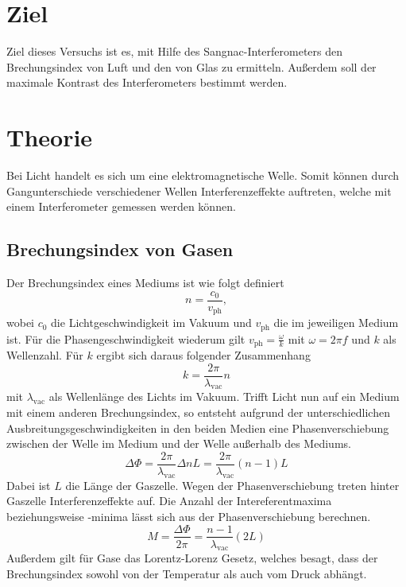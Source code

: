 \section{Ziel}
\label{sec:Ziel}
Ziel dieses Versuchs ist es, mit Hilfe des Sangnac-Interferometers den Brechungsindex von Luft und den von Glas zu ermitteln. Außerdem soll der maximale Kontrast des Interferometers bestimmt werden.

\section{Theorie}
\label{sec:theorie}
Bei Licht handelt es sich um eine elektromagnetische Welle. Somit können durch Gangunterschiede verschiedener Wellen Interferenzeffekte auftreten, welche mit einem Interferometer gemessen werden können.

\subsection{Brechungsindex von Gasen}
Der Brechungsindex eines Mediums ist wie folgt definiert
\begin{equation}
  n=\frac{c_0}{v_\mathrm{ph}},
\end{equation}
wobei $c_0$ die Lichtgeschwindigkeit im Vakuum und $v_\mathrm{ph}$ die im jeweiligen Medium ist. Für die Phasengeschwindigkeit wiederum gilt $v_\mathrm{ph}=\frac{\omega}{k}$ mit $\omega = 2\pi f$ und $k$ als Wellenzahl. Für $k$ ergibt sich daraus folgender Zusammenhang
\begin{equation}
  k=\frac{2\pi}{\lambda_\mathrm{vac}}n
\end{equation}
mit $\lambda_\mathrm{vac}$ als Wellenlänge des Lichts im Vakuum. Trifft Licht nun auf ein Medium mit einem anderen Brechungsindex, so entsteht aufgrund der unterschiedlichen Ausbreitungsgeschwindigkeiten in den beiden Medien eine Phasenverschiebung zwischen der Welle im Medium und der Welle außerhalb des Mediums.
\begin{equation}
  \Delta \Phi = \frac{2\pi}{\lambda_\mathrm{vac}}\Delta n L = \frac{2\pi}{\lambda_\mathrm{vac}}(n-1)L
\end{equation}
Dabei ist $L$ die Länge der Gaszelle. Wegen der Phasenverschiebung treten hinter Gaszelle Interferenzeffekte auf. Die Anzahl der Intereferentmaxima beziehungsweise -minima lässt sich aus der Phasenverschiebung berechnen.
\begin{equation}
  M=\frac{\Delta \Phi}{2\pi} = \frac{n-1}{\lambda_\mathrm{vac}}(2L)
\end{equation}
Außerdem gilt für Gase das Lorentz-Lorenz Gesetz, welches besagt, dass der Brechungsindex sowohl von der Temperatur als auch vom Druck abhängt.

